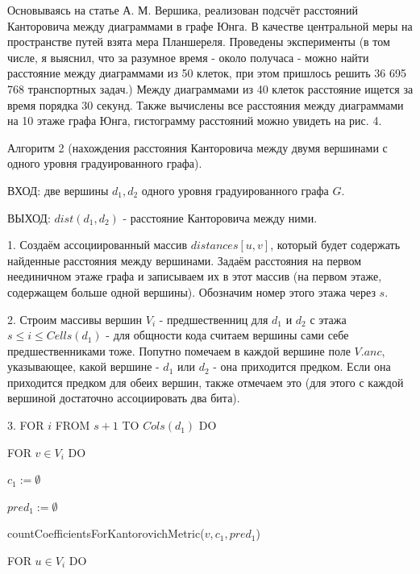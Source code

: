 \documentclass[12pt]{report}
\begin{document}
\hspace{\parindent} Основываясь на статье А. М. Вершика, реализован подсчёт расстояний Канторовича между диаграммами в графе Юнга. В качестве центральной меры на пространстве путей взята мера Планшереля. Проведены эксперименты (в том числе, я выяснил, что за разумное время - около получаса - можно найти расстояние между диаграммами из 50 клеток, при этом пришлось решить 36 695 768 транспортных задач.) Между диаграммами из 40 клеток расстояние ищется за время порядка 30 секунд. Также вычислены все расстояния между диаграммами на 10 этаже графа Юнга, гистограмму расстояний можно увидеть на рис. 4.

\vspace{1cm}

Алгоритм 2 (нахождения расстояния Канторовича между двумя вершинами с одного уровня градуированного графа).

ВХОД: две вершины $d_1, d_2$ одного уровня градуированного графа $G$.

ВЫХОД: $dist(d_1, d_2)$ - расстояние Канторовича между ними.

1. Создаём ассоциированный массив $distances[u, v]$, который будет содержать найденные расстояния между вершинами. Задаём расстояния на первом неединичном этаже графа и записываем их в этот массив (на первом этаже, содержащем больше одной вершины). Обозначим номер этого этажа через $s$.

2. Строим массивы вершин $V_i$ - предшественниц для $d_1$ и  $d_2$ с этажа $s \le i \le Cells(d_1)$ - для общности кода считаем вершины сами себе предшественниками тоже. Попутно помечаем в каждой вершине поле $V.anc$, указывающее, какой вершине - $d_1$ или $d_2$ - она приходится предком. Если она приходится предком для обеих вершин, также отмечаем это (для этого с каждой вершиной достаточно ассоциировать два бита). 

3. FOR $i$ FROM $s + 1$ TO $Cols(d_1)$ DO

\hspace{1cm} FOR $v \in V_i$ DO

\hspace{2cm} $c_1 := \emptyset$

\hspace{2cm} $pred_1 := \emptyset$

\hspace{2cm} countCoefficientsForKantorovichMetric($v, c_1, pred_1$)

\hspace{2cm} FOR $u \in V_i$ DO
\end{document}
